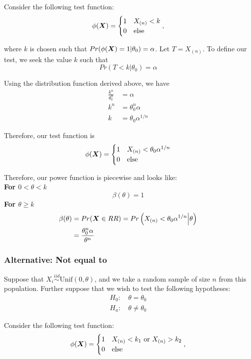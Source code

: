 \documentclass[]{article}
\newcommand{\bfX}{\mbox{\boldmath $X$}}
\begin{document}
Consider the following test function:
\[
\phi(\bfX) = \begin{cases}
1 & X_{(n)} < k \\
0 & \text{else}
\end{cases},
\]

where $k$ is chosen such that $Pr(\phi(\bfX) = 1|\theta_0) = \alpha$. Let $T = X_{(n)}$. To define our test, we seek the value $k$ such that 
\[
Pr(T < k | \theta_0) = \alpha
\]

Using the distribution function derived above, we have
\[
\begin{split}
\frac{k^n}{\theta_0^n} &= \alpha \\
k^n &= \theta_0^n\alpha \\
k &= \theta_0\alpha^{1/n}
\end{split}
\]

Therefore, our test function is
\[
\phi(\bfX) = \begin{cases}
1 & X_{(n)} < \theta_0\alpha^{1/n}  \\
0 & \text{else}
\end{cases}
\]

Therefore, our power function is piecewise and looks like:\\
\textbf{For $0 < \theta < k$}
\[
\beta(\theta) = 1
\]
\textbf{For $\theta \geq k$}
\[
\begin{split}
\beta(\theta) &= Pr(\bfX \in RR) = Pr\left(X_{(n)} < \theta_0\alpha^{1/n} \Big| \theta\right) \\
&= \frac{\theta_0^n\alpha}{\theta^n}
\end{split}
\]

\subsubsection{Alternative: Not equal to}

Suppose that $X_i \stackrel{iid}{\sim} \text{Unif}(0, \theta)$, and we take a random sample of size $n$ from this population. Further suppose that we wish to test the following hypotheses:
\[
\begin{split}
\text{$H_0$: }& \theta = \theta_0 \\
\text{$H_a$: }& \theta \neq \theta_0
\end{split}
\]

Consider the following test function:
\[
\phi(\bfX) = \begin{cases}
1 & X_{(n)} < k_1 \text{ or } X_{(n)} > k_2 \\
0 & \text{else}
\end{cases},
\]
\end{document}
